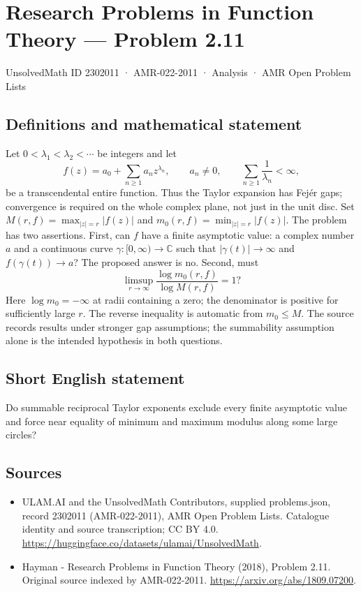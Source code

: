 \documentclass[11pt,a4paper]{article}
\begin{document}
\section*{Research Problems in Function Theory — Problem 2.11}\label{2302011}
{\small UnsolvedMath ID 2302011 · AMR-022-2011 · Analysis · AMR Open Problem Lists}
\subsection{Definitions and mathematical statement}
Let $0<\lambda_1<\lambda_2<\cdots$ be integers and let
\[
f(z)=a_0+\sum_{n\ge1}a_nz^{\lambda_n},\qquad a_n\ne0,
\qquad \sum_{n\ge1}\frac1{\lambda_n}<\infty,
\]
be a transcendental entire function. Thus the Taylor expansion has Fej\'er gaps; convergence is required on the whole complex plane, not just in the unit disc. Set
$M(r,f)=\max_{|z|=r}|f(z)|$ and $m_0(r,f)=\min_{|z|=r}|f(z)|$.
The problem has two assertions. First, can $f$ have a finite asymptotic value: a complex number $a$ and a continuous curve $\gamma:[0,\infty)\to\mathbb C$ such that $|\gamma(t)|\to\infty$ and $f(\gamma(t))\to a$? The proposed answer is no. Second, must
\[
\limsup_{r\to\infty}\frac{\log m_0(r,f)}{\log M(r,f)}=1?
\]
Here $\log m_0=-\infty$ at radii containing a zero; the denominator is positive for sufficiently large $r$. The reverse inequality is automatic from $m_0\le M$. The source records results under stronger gap assumptions; the summability assumption alone is the intended hypothesis in both questions.
\subsection{Short English statement}
Do summable reciprocal Taylor exponents exclude every finite asymptotic value and force near equality of minimum and maximum modulus along some large circles?
\subsection{Sources}
\begin{itemize}
\item[S1] ULAM.AI and the UnsolvedMath Contributors, supplied problems.json, record 2302011 (AMR-022-2011), AMR Open Problem Lists. Catalogue identity and source transcription; CC BY 4.0.
\url{https://huggingface.co/datasets/ulamai/UnsolvedMath}.
\item[S2] Hayman - Research Problems in Function Theory (2018), Problem 2.11. Original source indexed by AMR-022-2011.
\url{https://arxiv.org/abs/1809.07200}.
\end{itemize}
\end{document}
